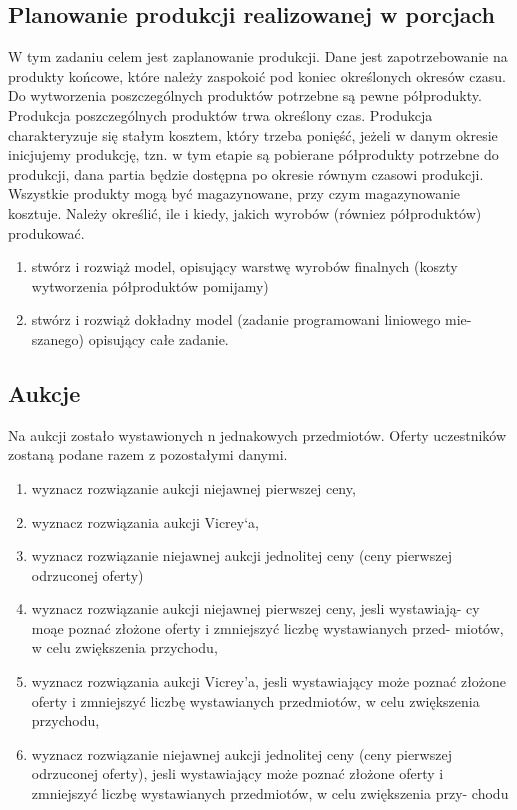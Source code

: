 \documentclass[
    12pt, %
]{../fphw}
\begin{document}
\subsection{Planowanie produkcji realizowanej w porcjach}
W tym zadaniu celem jest zaplanowanie produkcji. Dane jest zapotrzebowanie na produkty końcowe,
które należy zaspokoić pod koniec określonych okresów czasu. Do wytworzenia poszczególnych produktów potrzebne
są pewne półprodukty. Produkcja poszczególnych produktów trwa określony czas.
Produkcja charakteryzuje się stałym kosztem, który trzeba ponięść,
jeżeli w danym okresie inicjujemy produkcję, tzn. w tym etapie są pobierane
półprodukty potrzebne do produkcji, dana partia będzie dostępna po okresie
równym czasowi produkcji. Wszystkie produkty mogą być magazynowane,
przy czym magazynowanie kosztuje.
Należy określić, ile i kiedy, jakich wyrobów (równiez półproduktów) produkować.

\begin{enumerate}
    \item stwórz i rozwiąż model, opisujący warstwę wyrobów finalnych (koszty
          wytworzenia półproduktów pomijamy)
    \item stwórz i rozwiąż dokładny model (zadanie programowani liniowego mie-
          szanego) opisujący całe zadanie.
\end{enumerate}

\subsection{Aukcje}
Na aukcji zostało wystawionych n jednakowych przedmiotów. Oferty uczestników zostaną podane razem z pozostałymi danymi.

\begin{enumerate}
    \item \label{51} wyznacz rozwiązanie aukcji niejawnej pierwszej ceny,
    \item \label{52} wyznacz rozwiązania aukcji Vicrey`a,
    \item \label{53} wyznacz rozwiązanie niejawnej aukcji jednolitej ceny (ceny pierwszej
          odrzuconej oferty)
    \item \label{54} wyznacz rozwiązanie aukcji niejawnej pierwszej ceny, jesli wystawiają-
          cy moąe poznać złożone oferty i zmniejszyć liczbę wystawianych przed-
          miotów, w celu zwiększenia przychodu,
    \item \label{55} wyznacz rozwiązania aukcji Vicrey’a, jesli wystawiający może poznać
          złożone oferty i zmniejszyć liczbę wystawianych przedmiotów, w celu
          zwiększenia przychodu,
    \item \label{56} wyznacz rozwiązanie niejawnej aukcji jednolitej ceny (ceny pierwszej
          odrzuconej oferty), jesli wystawiający może poznać złożone oferty i
          zmniejszyć liczbę wystawianych przedmiotów, w celu zwiększenia przy-
          chodu
\end{enumerate}
\newpage
\end{document}
